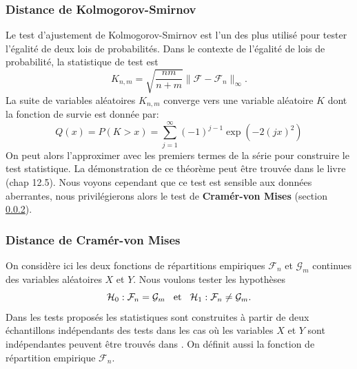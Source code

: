 \documentclass[a4paper,11pt]{article}
\numberwithin{equation}{section}
\begin{document}
\subsubsection{Distance de Kolmogorov-Smirnov}
\label{ch:Kolmogorov-Smirnov-distance}
Le test d'ajustement  de  Kolmogorov-Smirnov \cite{buning2002robustness} est  l'un des plus  utilisé pour tester l'égalité de deux lois  de probabilités. Dans  le  contexte de  l'égalité de lois  de probabilité, la statistique  de  test  est 
\[K_{n,m}= \sqrt{\frac{nm}{n+m}}\|\mathcal{F}-\mathcal{F}_n\|_{\infty}.\]
La suite de variables aléatoires $K_{n,m}$ converge vers une variable aléatoire $K$ dont la fonction de survie est donnée par: 
\begin{equation}
	Q(x)=P(K>x)=\sum_{j=1}^{\infty}(-1)^{j-1}\exp(-2(jx)^2)
\end{equation}
On peut alors l'approximer avec les premiers termes de la série pour construire le test statistique. La démonstration de ce théorème peut être trouvée dans le livre \cite{walker1965probability}(chap 12.5). Nous voyons cependant que ce test est sensible aux données aberrantes, nous privilégierons alors le test de \textbf{Cramér-von Mises} \cite{buning2002robustness} (section \ref{ch:Cv-M distance}).


\subsubsection{Distance de Cramér-von Mises}
\label{ch:Cv-M distance}
On considère ici les deux fonctions de répartitions empiriques $\mathcal{F}_{n}$ et $\mathcal{G}_{m}$ continues des variables aléatoires $X$ et $Y$. Nous voulons tester les hypothèses
\begin{equation*}
	\mathcal{H}_0 : \mathcal{F}_{n} = \mathcal{G}_{m} \hspace{3mm}\textrm{et}\hspace{3mm} \mathcal{H}_1 : \mathcal{F}_{n} \neq \mathcal{G}_{m}.
\end{equation*}
Dans les tests proposés les statistiques sont construites à partir de deux échantillons indépendants des tests dans les cas où les variables $X$ et $Y$ sont indépendantes peuvent être trouvés dans \cite{ethier2011propos}. On définit aussi la fonction de répartition empirique $\mathcal{F}_n$.
\end{document}
